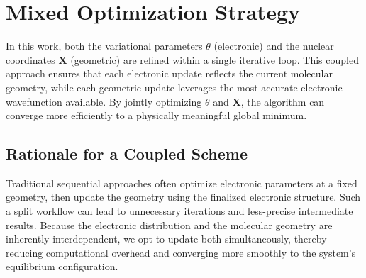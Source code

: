 \section{Mixed Optimization Strategy}

In this work, both the variational parameters \(\theta\) (electronic) and the nuclear coordinates \(\mathbf{X}\) (geometric) are refined within a single iterative loop. This coupled approach ensures that each electronic update reflects the current molecular geometry, while each geometric update leverages the most accurate electronic wavefunction available. By jointly optimizing \(\theta\) and \(\mathbf{X}\), the algorithm can converge more efficiently to a physically meaningful global minimum.

\subsection{Rationale for a Coupled Scheme}
Traditional sequential approaches often optimize electronic parameters at a fixed geometry, then update the geometry using the finalized electronic structure. Such a split workflow can lead to unnecessary iterations and less-precise intermediate results. Because the electronic distribution and the molecular geometry are inherently interdependent, we opt to update both simultaneously, thereby reducing computational overhead and converging more smoothly to the system's equilibrium configuration.

